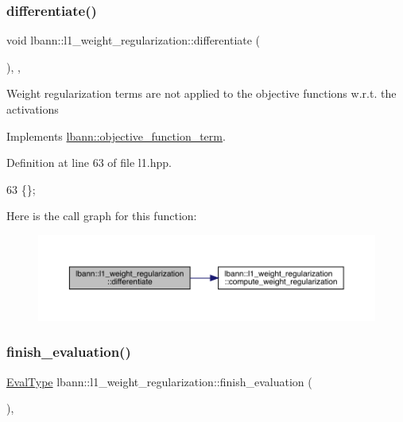 \subsubsection{\texorpdfstring{differentiate()}{differentiate()}}
{\footnotesize\ttfamily void lbann\+::l1\+\_\+weight\+\_\+regularization\+::differentiate (\begin{DoxyParamCaption}{ }\end{DoxyParamCaption})\hspace{0.3cm}{\ttfamily [inline]}, {\ttfamily [override]}, {\ttfamily [virtual]}}

Weight regularization terms are not applied to the objective functions w.\+r.\+t. the activations 

Implements \hyperlink{classlbann_1_1objective__function__term_ad009c3cfbe1cf2fbb6cce015b16fdac5}{lbann\+::objective\+\_\+function\+\_\+term}.



Definition at line 63 of file l1.\+hpp.


\begin{DoxyCode}
63 \{\};
\end{DoxyCode}
Here is the call graph for this function\+:\nopagebreak
\begin{figure}[H]
\begin{center}
\leavevmode
\includegraphics[width=350pt]{classlbann_1_1l1__weight__regularization_a329af165a876f4c1668aee84339e9ad2_cgraph}
\end{center}
\end{figure}
\mbox{\label{classlbann_1_1l1__weight__regularization_a5416b0c884e45854a03e0d2e2b3e63f3}} 
\subsubsection{\texorpdfstring{finish\+\_\+evaluation()}{finish\_evaluation()}}
{\footnotesize\ttfamily \hyperlink{base_8hpp_a3266f5ac18504bbadea983c109566867}{Eval\+Type} lbann\+::l1\+\_\+weight\+\_\+regularization\+::finish\+\_\+evaluation (\begin{DoxyParamCaption}{ }\end{DoxyParamCaption})\hspace{0.3cm}{\ttfamily [override]}, {\ttfamily [virtual]}}

